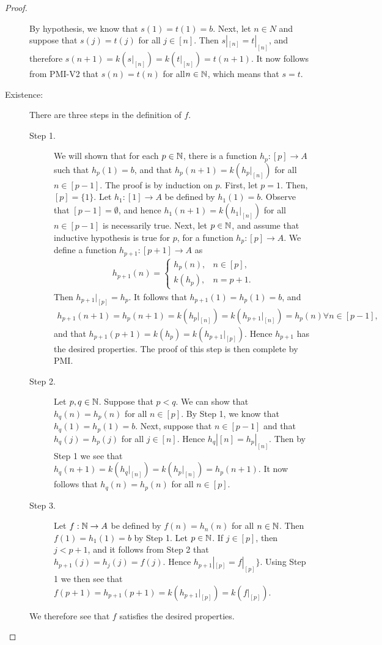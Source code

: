 \documentclass[a4paper,english,12pt]{article}
\begin{document}
\begin{proof}
\begin{description}
By hypothesis, we know that $s(1) = t(1) = b$. Next, let $n \in N$ and suppose that $s(j) = t(j)$ for all $j \in [n]$. Then $s|_{[n]} = t|_{[n]}$, and therefore $s(n + 1) = k(s|_{[n]}) = k(t|_{[n]}) = t(n + 1)$. It now follows from PMI-V2 that $s(n) = t(n)$ for all$ n \in \mathbb{N}$, which means that $s = t$. 
	\item[Existence:] There are three steps in the definition of $f$.
\begin{description}
	\item[Step 1.] We will shown that for each $p \in \mathbb{N}$, there is a function $h_p : [p] \to A$ such that $h_p(1)=b$, and that $h_p(n + 1) = k(h_p |_{[n]})$ for all $n \in [p-1]$. The proof is by induction on $p$. First, let $p=1$. Then, $[p] = \{1\}$. Let $h_1 : [1]\to A$ be defined by $h_1(1) = b$. Observe that $[p-1] = \emptyset$, and hence $h_1 (n + 1) = k(h_1 |_{[n]})$ for all $n\in [p-1]$ is necessarily true. Next, let $p \in \mathbb{N}$, and assume that inductive hypothesis is true for $p$, for a function $h_p: [p] \to A$. We define a function $h_{p+1}: [p+1] \to A$ as%
\begin{align*}
h_{p+1}(n)= \begin{cases}
h_p(n),  &n \in [p],\\ 
k(h_p),  &n=p+1. 
\end{cases}
\end{align*}
Then $h_{p+1} |_{[p]} = h_p$. It follows that $h_{p+1}(1) = h_p(1)=b$, and 
\begin{align*}
h_{p+1}(n + 1) = h_p(n+1) = k(h_p|_{[n]})=k(h_{p+1}|_{[n]}) = h_p(n) \forall n \in [p-1],
\end{align*}
and that $h_{p+1}(p+1) = k(h_p) = k(h_{p+1}|_{[p]})$. Hence $h_{p+1}$ has the desired properties. The proof of this step is then complete by PMI.
	\item[Step 2.] Let $p,q \in \mathbb{N}$. Suppose that $p < q$. We can show that $h_q(n) = h_p(n)$ for all $n\in [p]$. By Step 1, we know that $h_q(1) = h_p(1) = b$. Next, suppose that $n\in [p-1]$ and that $h_q(j)=h_p(j)$ for all $j \in [n].$ Hence $h_q|[n] = h_p |_{[n]}$. Then by Step 1 we see that $h_q(n+1)=k(h_q |_{[n]})=k(h_p |_{[n]})=h_p(n+1)$. It now follows that $h_q(n)=h_p(n)$ for all $n \in [p]$.
	\item[Step 3.] Let $f: \mathbb{N} \to A$ be defined by $f(n) = h_n(n)$ for all $n\in \mathbb{N}$. Then $f(1)=h_1(1)=b$ by Step 1. Let $p\in \mathbb{N}$. If $j\in [p]$, then $j < p + 1$, and it follows from Step 2 that $h_{p+1}(j)=h_j(j)=f(j)$. Hence $h_{p+1}|_{[p]}=f|_{[p]}\}$. Using Step 1 we then see that $f(p + 1) = h_{p+1}(p + 1) = k(h_{p+1}|_{[p]})=k(f|_{[p]})$. 
\end{description}	
We therefore see that $f$ satisfies the desired properties.
\end{description}
\end{proof}
\end{document}
